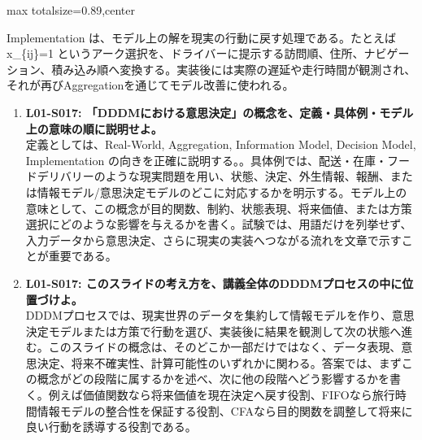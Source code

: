 \begin{minipage}[t]{0.58\textwidth}
\begin{adjustbox}{max totalsize={\textwidth}{0.89\textheight},center}
\begin{minipage}{\textwidth}
Implementation は、モデル上の解を現実の行動に戻す処理である。たとえば x\_\{ij\}=1 というアーク選択を、ドライバーに提示する訪問順、住所、ナビゲーション、積み込み順へ変換する。実装後には実際の遅延や走行時間が観測され、それが再びAggregationを通じてモデル改善に使われる。\par{}\begin{enumerate}\item \textbf{L01-S017: 「DDDMにおける意思決定」の概念を、定義・具体例・モデル上の意味の順に説明せよ。}\\定義としては、Real-World, Aggregation, Information Model, Decision Model, Implementation の向きを正確に説明する。。具体例では、配送・在庫・フードデリバリーのような現実問題を用い、状態、決定、外生情報、報酬、または情報モデル/意思決定モデルのどこに対応するかを明示する。モデル上の意味として、この概念が目的関数、制約、状態表現、将来価値、または方策選択にどのような影響を与えるかを書く。試験では、用語だけを列挙せず、入力データから意思決定、さらに現実の実装へつながる流れを文章で示すことが重要である。\item \textbf{L01-S017: このスライドの考え方を、講義全体のDDDMプロセスの中に位置づけよ。}\\DDDMプロセスでは、現実世界のデータを集約して情報モデルを作り、意思決定モデルまたは方策で行動を選び、実装後に結果を観測して次の状態へ進む。このスライドの概念は、そのどこか一部だけではなく、データ表現、意思決定、将来不確実性、計算可能性のいずれかに関わる。答案では、まずこの概念がどの段階に属するかを述べ、次に他の段階へどう影響するかを書く。例えば価値関数なら将来価値を現在決定へ戻す役割、FIFOなら旅行時間情報モデルの整合性を保証する役割、CFAなら目的関数を調整して将来に良い行動を誘導する役割である。\end{enumerate}
\end{minipage}
\end{adjustbox}
\end{minipage}


